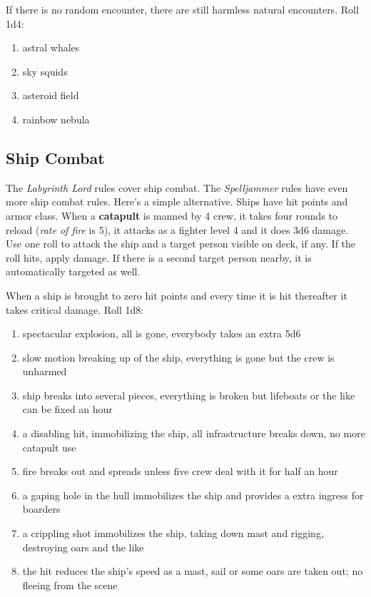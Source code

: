\documentclass[11pt]{bxart}
\begin{document}
If there is no random encounter, there are still harmless natural
encounters. Roll 1d4:

\begin{enumerate}
\item astral whales
\item sky squids
\item asteroid field
\item rainbow nebula
\end{enumerate}

\newpage

\subsection{Ship Combat}

The \textit{Labyrinth Lord} rules cover ship combat. The
\textit{Spelljammer} rules have even more ship combat rules. Here's a
simple alternative. Ships have hit points and armor class. When a
\textbf{catapult} is manned by 4 crew, it takes four rounds to reload
(\textit{rate of fire} is 5), it attacks as a fighter level 4 and it
does 3d6 damage. Use one roll to attack the ship and a target person
visible on deck, if any. If the roll hits, apply damage. If there is a
second target person nearby, it is automatically targeted as well.

When a ship is brought to zero hit points and every time it is hit
thereafter it takes critical damage. Roll 1d8:

\begin{enumerate}
\item spectacular explosion, all is gone, everybody takes an extra 5d6
\item slow motion breaking up of the ship, everything is gone but the
  crew is unharmed
\item ship breaks into several pieces, everything is broken but
  lifeboats or the like can be fixed an hour
\item a disabling hit, immobilizing the ship, all infrastructure
  breaks down, no more catapult use
\item fire breaks out and spreads unless five crew deal with it for
  half an hour
\item a gaping hole in the hull immobilizes the ship and provides a
  extra ingress for boarders
\item a crippling shot immobilizes the ship, taking down mast and
  rigging, destroying oars and the like
\item the hit reduces the ship's speed as a mast, sail or some oars
  are taken out; no fleeing from the scene
\end{enumerate}
\end{document}
